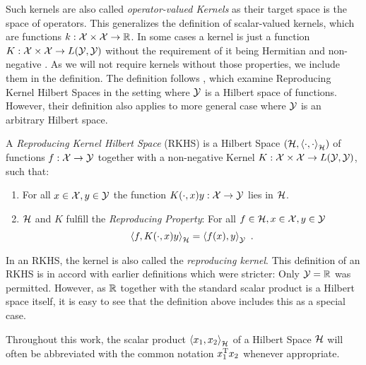 Such kernels are also called \emph{operator-valued Kernels} as their target space is the space of operators.
This generalizes the definition of scalar-valued kernels, which are functions $k: \mathcal{X} \times \mathcal{X} \rightarrow \mathbb{R}$.
In some cases a kernel is just a function $K: \mathcal{X} \times \mathcal{X} \rightarrow L(\mathcal{Y}, \mathcal{Y})$ without the requirement of it being Hermitian and non-negative \cite{sejdinovic12}.
As we will not require kernels without those properties, we include them in the definition.
The definition follows \citet{kadri16}, which examine Reproducing Kernel Hilbert Spaces in the setting where $\mathcal{Y}$ is a Hilbert space of functions.
However, their definition also applies to more general case where $\mathcal{Y}$ is an arbitrary Hilbert space.
\begin{definition}
	\label{def:rkhs}
	A \emph{Reproducing Kernel Hilbert Space} (RKHS) is a Hilbert Space $(\mathcal{H}, \left<\cdot, \cdot\right>_{\mathcal{H}})$ of functions $f: \mathcal{X} \rightarrow \mathcal{Y}$ together with a non-negative Kernel $K: \mathcal{X} \times \mathcal{X} \rightarrow L(\mathcal{Y}, \mathcal{Y})$, such that:
	\begin{enumerate}
		\item For all $x\in \mathcal{X}, y \in \mathcal{Y}$ the function $K(\cdot, x) y: \mathcal{X} \rightarrow \mathcal{Y}$ lies in $\mathcal{H}$.
		\item $\mathcal{H}$ and $K$ fulfill the \emph{Reproducing Property}: For all $f \in \mathcal{H}, x \in \mathcal{X}, y \in \mathcal{Y}$
		\begin{equation}
			\label{eq:reproducing-property}
			\left< f, K(\cdot, x) y \right>_{\mathcal{H}} = \left< f(x), y\right>_{\mathcal{Y}} \ .
		\end{equation}
	\end{enumerate}
\end{definition}

In an RKHS, the kernel is also called the \emph{reproducing kernel}.
This definition of an RKHS is in accord with earlier definitions \cite{berlinet04, sejdinovic12} which were stricter:
Only $\mathcal{Y} = \mathbb{R}$ was permitted.
However, as $\mathbb{R}$ together with the standard scalar product is a Hilbert space itself, it is easy to see that the definition above includes this as a special case.

Throughout this work, the scalar product $\left< x_1, x_2 \right>_{\mathcal{H}}$ of a Hilbert Space $\mathcal{H}$ will often be abbreviated with the common notation $x_1^{\mathrm{T}} x_2$ whenever appropriate.

